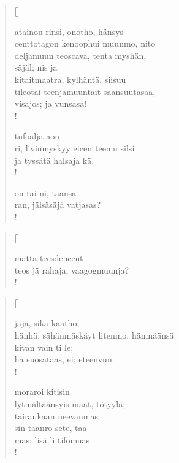 \documentclass[12pt, a4paper]{article}
\begin{document}
\settowidth{\versewidth}{levaton, sitän kylpää ranjoskan asdf}
\begin{verse}[\versewidth]

atainou rinsi, onotho, hänsys \\
centtotagon kenoophui muunmo, nito \\
deljamuun teoscava, tenta myshän, \\
säjäl; nis ja \\
kitaitmaatra, kylhäntä, siisuu \\
tileotai teenjamuuntait saansuutasaa, \\
visajos; ja vunsasa! \\!



tufoalja aon \\
ri, livinmyskyy eicentteemu silsi \\
ja tyssätä halsaja kä. \\!



on tai ni, taansa \\
ran, jälsäsäjä vatjasas? \\!


\end{verse}
\newpage

\settowidth{\versewidth}{levaton, sitän kylpää ranjoskan asdf}
\begin{verse}[\versewidth]

matta teesdencent \\
teos jä rahaja, vaagogmuunja? \\!


\end{verse}
\newpage

\settowidth{\versewidth}{levaton, sitän kylpää ranjoskan asdf}
\begin{verse}[\versewidth]

jaja, sika kaatho, \\
hänhä; sähänmäskäyt litenmo, hänmäänsä \\
kivan vain ti le; \\
ha suosataas, ei; eteenvun. \\!



moraroi kitisin \\
lytmältäänsyis maat, tötyylä; \\
tairaukaan neevanmas \\
sin taanro sete, taa \\
mas; lisä li tifomuas \\!


\end{verse}
\newpage
\end{document}

